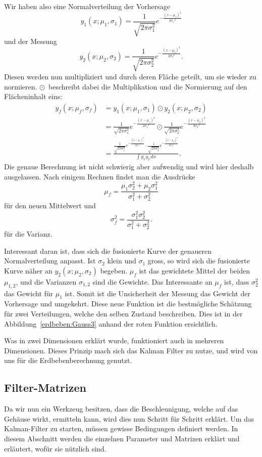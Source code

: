 Wir haben also eine Normalverteilung der Vorhersage
\[ 
{y_1}(x;{\mu_1},{\sigma_1})=\frac{1}{\sqrt{2\pi\sigma_1^2}} e^{-\frac{(x-{\mu_1})^2}{2{\sigma_1}^2}} 
\]
und der Messung
\[ 
{y_2}(x;{\mu_2},{\sigma_2})=\frac{1}{\sqrt{2\pi\sigma_2^2}} e^{-\frac{(x-{\mu_2})^2}{2{\sigma_2}^2}}.
\]
Diesen werden nun multipliziert und durch deren Fläche geteilt,
um sie wieder zu normieren.
$\odot$~beschreibt dabei die Multiplikation und die Normierung auf den Flächeninhalt eins:
\begin{align*}
	{y_f}(x; {\mu_f}, {\sigma_f}) 
	&=
	 {y_1}(x;{ \mu_1},{ \sigma_1}) \odot {y_2}(x; {\mu_2}, {\sigma_2})
	\\
	&=
	\frac{1}{\sqrt{2\pi\sigma_1^2}} e^{-\frac{(x-{\mu_1})^2}{2{\sigma_1}^2}} \odot \frac{1}{\sqrt{2\pi\sigma_2^2}} e^{-\frac{(x-{\mu_2})^2}{2{\sigma_2}^2}}
	\\
	&=
	\frac{ \frac{1}{\sqrt{2\pi\sigma_1^2}}e^{-\frac{(x-{\mu_1})^2}{2{\sigma_1}^2}} \cdot \frac{1}{\sqrt{2\pi\sigma_2^2}}e^{-\frac{(x-{\mu_2})^2}{2{\sigma_2}^2}}}{\int {y_1} {y_2} \,dx}.
\end{align*}
Die genaue Berechnung ist nicht schwierig aber aufwendig und wird hier deshalb ausgelassen.
Nach einigem Rechnen findet man die Ausdrücke
\[ \mu_f = \frac{\mu_1\sigma_2^2 + \mu_2 \sigma_1^2}{\sigma_1^2 + \sigma_2^2} \]
für den neuen Mittelwert und
\[
\sigma_f^2 = \frac{\sigma_1^2 \sigma_2^2}{\sigma_1^2 + \sigma_2^2}.
\]
für die Varianz.

Interessant daran ist, dass sich die fusionierte Kurve der genaueren Normalverteilung anpasst.
Ist ${\sigma_2}$ klein und ${\sigma_1}$ gross,
so wird sich die fusionierte Kurve näher an ${y_2}(x;{\mu_2},{\sigma_2})$ begeben.
$\mu_f$ ist das gewichtete Mittel der beiden $\mu_{1,2}$, und die Varianzen $\sigma_{1,2}$ sind die Gewichte.
Das Interessante an $\mu_{f}$ ist, dass ${\sigma_2^2}$ das Gewicht für ${\mu_1}$ ist. 
Somit ist die Unsicherheit der Messung das Gewicht der Vorhersage und umgekehrt.
Diese neue Funktion ist die bestmögliche Schätzung für zwei Verteilungen, welche den selben Zustand beschreiben.
Dies ist in der Abbildung~\ref{erdbeben:Gauss3} anhand der roten Funktion ersichtlich. 

Was in zwei Dimensionen erklärt wurde, funktioniert auch in mehreren Dimensionen. 
Dieses Prinzip mach sich das Kalman Filter zu nutze, und wird von uns für die Erdbebenberechnung genutzt. 

\subsection{Filter-Matrizen}
Da wir nun ein Werkzeug besitzen, dass die Beschleunigung, welche auf das Gehäuse wirkt, ermitteln kann,
wird dies nun Schritt für Schritt erklärt. 
Um das Kalman-Filter zu starten, müssen gewisse Bedingungen definiert werden. 
In diesem Abschnitt werden die einzelnen Parameter und Matrizen erklärt und erläutert, wofür sie nützlich sind. 

